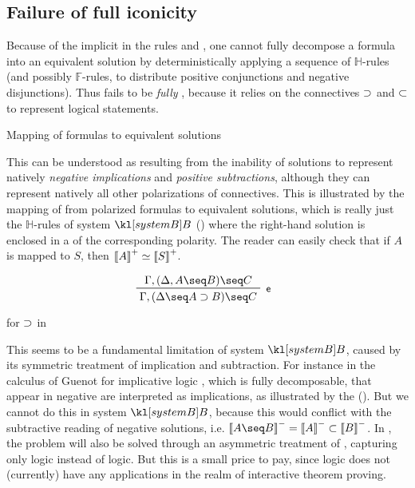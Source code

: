 \subsection{Failure of full iconicity}

Because of the implicit  in the rules \rsf{{\limp}{-}} and
\rsf{{\lsub}{+}}, one cannot fully decompose a formula into an equivalent
solution by deterministically applying a sequence of $\mathbb{H}$-rules (and
possibly $\mathbb{F}$-rules, to distribute positive conjunctions and negative
disjunctions). Thus  fails to be \emph{fully }, because it
relies on the \emph{} connectives $\supset$ and $\subset$ to represent
logical statements.

\begin{marginfigure}
  
  \caption{Mapping of formulas to equivalent solutions}
\end{marginfigure}

This can be understood as resulting from the inability of solutions to represent
natively \emph{negative implications} and \emph{positive subtractions}, although
they can represent natively all other polarizations of connectives. This is
illustrated by the mapping of  from polarized formulas to
equivalent solutions, which is really just the $\mathbb{H}$-rules of system
$\sysB$ () where the right-hand solution is enclosed in a
 of the corresponding polarity. The reader can easily check that if $A$ is
mapped to $S$, then $\left\llbracket A \right\rrbracket^+ \simeq \left\llbracket S \right\rrbracket^+$.

\begin{marginfigure}
  $$
  \R[\rsf{e}]
    {\Gamma, (\Delta, A \seq B) \seq C}
    {\Gamma, (\Delta \seq A \limp B) \seq C}
  $$
  \caption{ for $\supset$ in }
\end{marginfigure}

This seems to be a fundamental limitation of system $\sysB$, caused by its
symmetric treatment of implication and subtraction. For instance in the  calculus  of Guenot for implicative logic \cite[Chapter
3]{guenot_nested_2013}, which is fully decomposable,  that appear
in negative  are interpreted as implications, as illustrated by the
  (). But we cannot do this
in system $\sysB$, because this would conflict with the subtractive reading of
negative solutions, i.e. $\nsint{A \seq B} = \nsint{A} \lsub \nsint{B}$. In
, the problem will also be solved through an asymmetric treatment
of , capturing only  logic instead of
 logic. But this is a small price to pay, since
 logic does not (currently) have any applications in the
realm of interactive theorem proving.